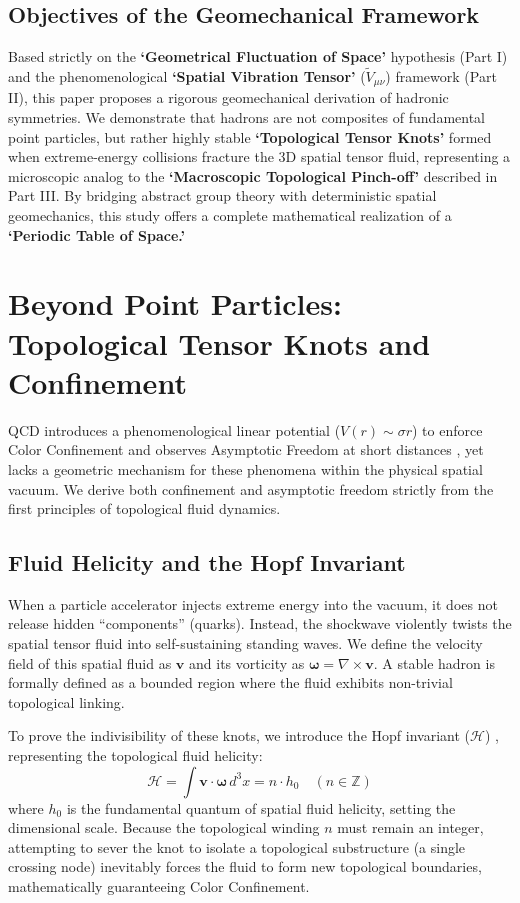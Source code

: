 \documentclass[reprint,amsmath,amssymb,aps,prd]{revtex4-2}
\begin{document}
\subsection{Objectives of the Geomechanical Framework}
Based strictly on the \textbf{`Geometrical Fluctuation of Space'} hypothesis (Part I) and the phenomenological \textbf{`Spatial Vibration Tensor'} ($\tilde{V}_{\mu\nu}$) framework (Part II), this paper proposes a rigorous geomechanical derivation of hadronic symmetries. We demonstrate that hadrons are not composites of fundamental point particles, but rather highly stable \textbf{`Topological Tensor Knots'} formed when extreme-energy collisions fracture the 3D spatial tensor fluid, representing a microscopic analog to the \textbf{`Macroscopic Topological Pinch-off'} described in Part III. By bridging abstract group theory with deterministic spatial geomechanics, this study offers a complete mathematical realization of a \textbf{`Periodic Table of Space.'}

\section{Beyond Point Particles: Topological Tensor Knots and Confinement}

QCD introduces a phenomenological linear potential ($V(r) \sim \sigma r$) to enforce Color Confinement and observes Asymptotic Freedom at short distances \cite{Gross1973}, yet lacks a geometric mechanism for these phenomena within the physical spatial vacuum. We derive both confinement and asymptotic freedom strictly from the first principles of topological fluid dynamics.

\subsection{Fluid Helicity and the Hopf Invariant}
When a particle accelerator injects extreme energy into the vacuum, it does not release hidden ``components'' (quarks). Instead, the shockwave violently twists the spatial tensor fluid into self-sustaining standing waves. We define the velocity field of this spatial fluid as $\mathbf{v}$ and its vorticity as $\boldsymbol{\omega} = \nabla \times \mathbf{v}$. A stable hadron is formally defined as a bounded region where the fluid exhibits non-trivial topological linking.

To prove the indivisibility of these knots, we introduce the Hopf invariant ($\mathcal{H}$) \cite{Hopf1931, Moffatt1969}, representing the topological fluid helicity:
\begin{equation}
\mathcal{H} = \int \mathbf{v} \cdot \boldsymbol{\omega} \, d^3x = n \cdot h_0 \quad (n \in \mathbb{Z})
\end{equation}
where $h_0$ is the fundamental quantum of spatial fluid helicity, setting the dimensional scale. Because the topological winding $n$ must remain an integer, attempting to sever the knot to isolate a topological substructure (a single crossing node) inevitably forces the fluid to form new topological boundaries, mathematically guaranteeing Color Confinement.
\end{document}
